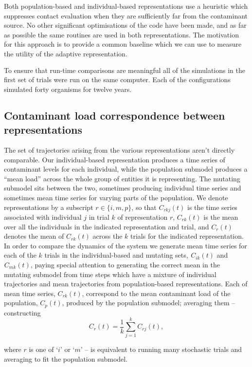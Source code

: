 \documentclass{article}
\newcommand{\tmmathbf}[1]{\ensuremath{\boldsymbol{#1}}}
\begin{document}
Both population-based and individual-based representations use a heuristic
which suppresses contact evaluation when they are sufficiently far from the
contaminant source. No other significant optimisations of the code have been
made, and as far as possible the same routines are used in both
representations. The motivation for this approach is to provide a common
baseline which we can use to measure the utility of the adaptive
representation.

To ensure that run-time comparisons are meaningful all of the simulations in
the first set of trials were run on the same computer. Each of the
configurations simulated forty organisms for twelve years.

\subsection{Contaminant load correspondence between representations}

The set of trajectories arising from the various representations aren't
directly comparable. Our individual-based representation produces a time
series of contaminant levels for each individual, while the population
submodel produces a ``mean load'' across the whole group of entities it is
representing. The mutating submodel sits between the two, sometimes producing
individual time series and sometimes mean time series for varying parts of the
population. We denote representations by a subscript $r \in \{i, m, p\}$, so
that $C_{r k j} (t)$ is the time series associated with individual $j$ in
trial $k$ of representation $r$, $C_{r k} (t)$ is the mean over all the
individuals in the indicated representation and trial, and $C_r (t)$ denotes
the mean of $C_{r k} (t)$ across the $k$ trials for the indicated
representation. In order to compare the dynamics of the system we generate
mean time series for each of the $k$ trials in the individual-based and
mutating sets, $^{} C_{i k} (t)$ and $^{} C \tmmathbf{}_{m k} (t)$, paying
special attention to generating the correct mean in the mutating submodel from
time steps which have a mixture of individual trajectories and mean
trajectories from population-based representations. Each of mean time series,
$C_{r k} (t)$, correspond to the mean contaminant load of the population, $C_p
(t)$, produced by the population submodel; averaging them -- constructing
\[  C_r (t) = \frac{1}{k} \sum^k_{j = 1} C_{r j} (t), \]


where $r$ is one of `$i$' or `$m$' -- is equivalent to running many stochastic
trials and averaging to fit the population submodel.
\end{document}
